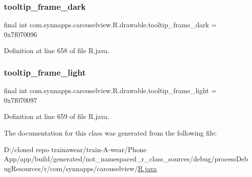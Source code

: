 \subsubsection{\texorpdfstring{tooltip\_frame\_dark}{tooltip\_frame\_dark}}
{\footnotesize\ttfamily final int com.\+synnapps.\+carouselview.\+R.\+drawable.\+tooltip\+\_\+frame\+\_\+dark = 0x7f070096\hspace{0.3cm}{\ttfamily [static]}}



Definition at line 658 of file R.\+java.

\mbox{\label{classcom_1_1synnapps_1_1carouselview_1_1_r_1_1drawable_a78fe30cf04c463f9c93e80544eba061f}} 
\subsubsection{\texorpdfstring{tooltip\_frame\_light}{tooltip\_frame\_light}}
{\footnotesize\ttfamily final int com.\+synnapps.\+carouselview.\+R.\+drawable.\+tooltip\+\_\+frame\+\_\+light = 0x7f070097\hspace{0.3cm}{\ttfamily [static]}}



Definition at line 659 of file R.\+java.



The documentation for this class was generated from the following file\+:\begin{DoxyCompactItemize}
\item 
D\+:/cloned repo trainawear/train-\/\+A-\/wear/\+Phone App/app/build/generated/not\+\_\+namespaced\+\_\+r\+\_\+class\+\_\+sources/debug/process\+Debug\+Resources/r/com/synnapps/carouselview/\mbox{\hyperlink{process_debug_resources_2r_2com_2synnapps_2carouselview_2_r_8java}{R.\+java}}\end{DoxyCompactItemize}
